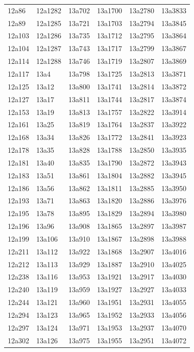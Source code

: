 \documentclass[12pt, oneside]{amsart}
\begin{document}
{\begin{longtable}{*{6}{>{\raggedright\arraybackslash}p{}}}
12a86 & 12a1282 & 13a702 & 13a1700 & 13a2780 & 13a3833 \\
12a89 & 12a1285 & 13a721 & 13a1703 & 13a2794 & 13a3845 \\
12a103 & 12a1286 & 13a735 & 13a1712 & 13a2795 & 13a3864 \\
12a104 & 12a1287 & 13a743 & 13a1717 & 13a2799 & 13a3867 \\
12a114 & 12a1288 & 13a746 & 13a1719 & 13a2807 & 13a3869 \\
12a117 & 13a4 & 13a798 & 13a1725 & 13a2813 & 13a3871 \\
12a125 & 13a12 & 13a800 & 13a1741 & 13a2814 & 13a3872 \\
12a127 & 13a17 & 13a811 & 13a1744 & 13a2817 & 13a3874 \\
12a153 & 13a19 & 13a813 & 13a1757 & 13a2822 & 13a3914 \\
12a161 & 13a25 & 13a819 & 13a1764 & 13a2837 & 13a3922 \\
12a168 & 13a34 & 13a826 & 13a1772 & 13a2841 & 13a3923 \\
12a178 & 13a35 & 13a828 & 13a1788 & 13a2850 & 13a3935 \\
12a181 & 13a40 & 13a835 & 13a1790 & 13a2872 & 13a3943 \\
12a183 & 13a51 & 13a861 & 13a1804 & 13a2882 & 13a3945 \\
12a186 & 13a56 & 13a862 & 13a1811 & 13a2885 & 13a3950 \\
12a193 & 13a71 & 13a863 & 13a1820 & 13a2886 & 13a3976 \\
12a195 & 13a78 & 13a895 & 13a1829 & 13a2894 & 13a3980 \\
12a196 & 13a96 & 13a908 & 13a1865 & 13a2897 & 13a3987 \\
12a199 & 13a106 & 13a910 & 13a1867 & 13a2898 & 13a3988 \\
12a211 & 13a112 & 13a922 & 13a1868 & 13a2907 & 13a4016 \\
12a212 & 13a113 & 13a929 & 13a1887 & 13a2910 & 13a4025 \\
12a238 & 13a116 & 13a953 & 13a1921 & 13a2917 & 13a4030 \\
12a240 & 13a119 & 13a959 & 13a1927 & 13a2927 & 13a4033 \\
12a244 & 13a121 & 13a960 & 13a1951 & 13a2931 & 13a4055 \\
12a294 & 13a123 & 13a965 & 13a1952 & 13a2933 & 13a4056 \\
12a297 & 13a124 & 13a971 & 13a1953 & 13a2937 & 13a4070 \\
12a302 & 13a126 & 13a975 & 13a1955 & 13a2951 & 13a4072 \\

\end{longtable}}
\end{document}
